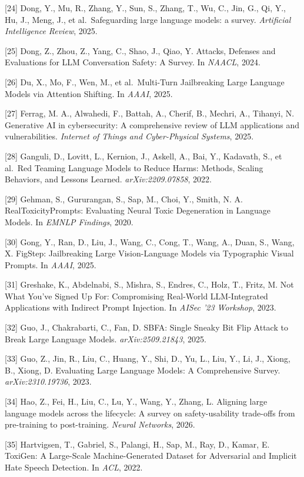{[}24{]} Dong, Y., Mu, R., Zhang, Y., Sun, S., Zhang, T., Wu, C., Jin, G., Qi, Y., Hu, J., Meng, J., et al.~Safeguarding large language models: a survey. \emph{Artificial Intelligence Review}, 2025.

{[}25{]} Dong, Z., Zhou, Z., Yang, C., Shao, J., Qiao, Y. Attacks, Defenses and Evaluations for LLM Conversation Safety: A Survey. In \emph{NAACL}, 2024.

{[}26{]} Du, X., Mo, F., Wen, M., et al.~Multi-Turn Jailbreaking Large Language Models via Attention Shifting. In \emph{AAAI}, 2025.

{[}27{]} Ferrag, M. A., Alwahedi, F., Battah, A., Cherif, B., Mechri, A., Tihanyi, N. Generative AI in cybersecurity: A comprehensive review of LLM applications and vulnerabilities. \emph{Internet of Things and Cyber-Physical Systems}, 2025.

{[}28{]} Ganguli, D., Lovitt, L., Kernion, J., Askell, A., Bai, Y., Kadavath, S., et al.~Red Teaming Language Models to Reduce Harms: Methods, Scaling Behaviors, and Lessons Learned. \emph{arXiv:2209.07858}, 2022.

{[}29{]} Gehman, S., Gururangan, S., Sap, M., Choi, Y., Smith, N. A. RealToxicityPrompts: Evaluating Neural Toxic Degeneration in Language Models. In \emph{EMNLP Findings}, 2020.

{[}30{]} Gong, Y., Ran, D., Liu, J., Wang, C., Cong, T., Wang, A., Duan, S., Wang, X. FigStep: Jailbreaking Large Vision-Language Models via Typographic Visual Prompts. In \emph{AAAI}, 2025.

{[}31{]} Greshake, K., Abdelnabi, S., Mishra, S., Endres, C., Holz, T., Fritz, M. Not What You've Signed Up For: Compromising Real-World LLM-Integrated Applications with Indirect Prompt Injection. In \emph{AISec '23 Workshop}, 2023.

{[}32{]} Guo, J., Chakrabarti, C., Fan, D. SBFA: Single Sneaky Bit Flip Attack to Break Large Language Models. \emph{arXiv:2509.21843}, 2025.

{[}33{]} Guo, Z., Jin, R., Liu, C., Huang, Y., Shi, D., Yu, L., Liu, Y., Li, J., Xiong, B., Xiong, D. Evaluating Large Language Models: A Comprehensive Survey. \emph{arXiv:2310.19736}, 2023.

{[}34{]} Hao, Z., Fei, H., Liu, C., Lu, Y., Wang, Y., Zhang, L. Aligning large language models across the lifecycle: A survey on safety-usability trade-offs from pre-training to post-training. \emph{Neural Networks}, 2026.

{[}35{]} Hartvigsen, T., Gabriel, S., Palangi, H., Sap, M., Ray, D., Kamar, E. ToxiGen: A Large-Scale Machine-Generated Dataset for Adversarial and Implicit Hate Speech Detection. In \emph{ACL}, 2022.


